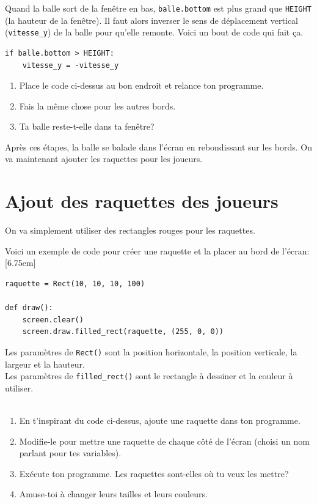 \documentclass[11pt]{article}
\begin{document}
Quand la balle sort de la fenêtre en bas,
\lstinline{balle.bottom} est plus grand que \lstinline{HEIGHT} (la hauteur de la fenêtre).
Il faut alors inverser le sens de déplacement vertical (\lstinline{vitesse_y}) de la balle pour qu'elle remonte.
Voici un bout de code qui fait ça.

\begin{lstlisting}
if balle.bottom > HEIGHT:
    vitesse_y = -vitesse_y
\end{lstlisting}

\begin{enumerate}
    \item Place le code ci-dessus au bon endroit et relance ton programme.
    \item Fais la même chose pour les autres bords.
    \item Ta balle reste-t-elle dans ta fenêtre?
\end{enumerate}

Après ces étapes, la balle se balade dans l'écran en rebondissant sur les bords.
On va maintenant ajouter les raquettes pour les joueurs.

\section{Ajout des raquettes des joueurs}

On va simplement utiliser des rectangles rouges pour les raquettes.

Voici un exemple de code pour créer une raquette et la placer au bord de l'écran:
\marginnote{\textcolor{deepblue}{filled~=~rempli}}[6.75em]

\begin{lstlisting}
raquette = Rect(10, 10, 10, 100)

def draw():
    screen.clear()
    screen.draw.filled_rect(raquette, (255, 0, 0))
\end{lstlisting}

Les paramètres de \lstinline{Rect()} sont la position horizontale, la position verticale, la largeur et la hauteur.\\
Les paramètres de \lstinline{filled_rect()} sont le rectangle à dessiner et la couleur à utiliser.
\\
\\

\begin{enumerate}
    \item En t'inspirant du code ci-dessus, ajoute une raquette dans ton programme.
    \item Modifie-le pour mettre une raquette de chaque côté de l'écran (choisi un nom parlant pour tes variables).
    \item Exécute ton programme. Les raquettes sont-elles où tu veux les mettre?
    \item Amuse-toi à changer leurs tailles et leurs couleurs.
\end{enumerate}
\end{document}
